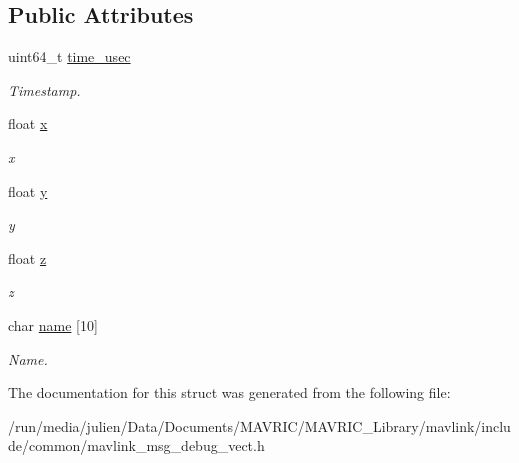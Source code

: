 \subsection*{Public Attributes}
\begin{DoxyCompactItemize}
\item 
\hypertarget{struct____mavlink__debug__vect__t_a8ce7a8e6e061bff40d49ca81fdd3ce33}{uint64\+\_\+t \hyperlink{struct____mavlink__debug__vect__t_a8ce7a8e6e061bff40d49ca81fdd3ce33}{time\+\_\+usec}}\label{struct____mavlink__debug__vect__t_a8ce7a8e6e061bff40d49ca81fdd3ce33}

\begin{DoxyCompactList}\small\item\em Timestamp. \end{DoxyCompactList}\item 
\hypertarget{struct____mavlink__debug__vect__t_a9a222c84369ea74593be0625abb29bc8}{float \hyperlink{struct____mavlink__debug__vect__t_a9a222c84369ea74593be0625abb29bc8}{x}}\label{struct____mavlink__debug__vect__t_a9a222c84369ea74593be0625abb29bc8}

\begin{DoxyCompactList}\small\item\em x \end{DoxyCompactList}\item 
\hypertarget{struct____mavlink__debug__vect__t_a400c1d51e5edb6686737999ae6e4aba7}{float \hyperlink{struct____mavlink__debug__vect__t_a400c1d51e5edb6686737999ae6e4aba7}{y}}\label{struct____mavlink__debug__vect__t_a400c1d51e5edb6686737999ae6e4aba7}

\begin{DoxyCompactList}\small\item\em y \end{DoxyCompactList}\item 
\hypertarget{struct____mavlink__debug__vect__t_a8fdd83fc7a64d6a8200dea9dddf58ee9}{float \hyperlink{struct____mavlink__debug__vect__t_a8fdd83fc7a64d6a8200dea9dddf58ee9}{z}}\label{struct____mavlink__debug__vect__t_a8fdd83fc7a64d6a8200dea9dddf58ee9}

\begin{DoxyCompactList}\small\item\em z \end{DoxyCompactList}\item 
\hypertarget{struct____mavlink__debug__vect__t_abc0b0dfd2c40f1380bb08a959abe17d5}{char \hyperlink{struct____mavlink__debug__vect__t_abc0b0dfd2c40f1380bb08a959abe17d5}{name} \mbox{[}10\mbox{]}}\label{struct____mavlink__debug__vect__t_abc0b0dfd2c40f1380bb08a959abe17d5}

\begin{DoxyCompactList}\small\item\em Name. \end{DoxyCompactList}\end{DoxyCompactItemize}


The documentation for this struct was generated from the following file\+:\begin{DoxyCompactItemize}
\item 
/run/media/julien/\+Data/\+Documents/\+M\+A\+V\+R\+I\+C/\+M\+A\+V\+R\+I\+C\+\_\+\+Library/mavlink/include/common/mavlink\+\_\+msg\+\_\+debug\+\_\+vect.\+h\end{DoxyCompactItemize}
